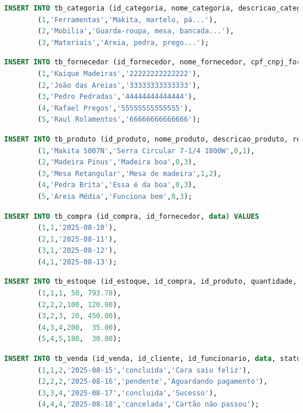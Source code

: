 \documentclass[
12pt,
a4paper,
semrecuonosumario,
sumario = abnt-6027-2012]{report}
\begin{document}
    \begin{lstlisting}[language=SQL,caption={DML -- Tabela \texttt{tb\_categoria}}]
		INSERT INTO tb_categoria (id_categoria, nome_categoria, descricao_categoria) VALUES
		(1,'Ferramentas','Makita, martelo, pá...'),
		(2,'Mobilia','Guarda-roupa, mesa, bancada...'),
		(3,'Materiais','Areia, pedra, prego...');
    \end{lstlisting}

    \begin{lstlisting}[language=SQL,caption={DML -- Tabela \texttt{tb\_fornecedor}}]
		INSERT INTO tb_fornecedor (id_fornecedor, nome_fornecedor, cpf_cnpj_fornecedor) VALUES
		(1,'Kaique Madeiras','22222222222222'),
		(2,'João das Areias','33333333333333'),
		(3,'Pedro Pedradas','44444444444444'),
		(4,'Rafael Pregos','55555555555555'),
		(5,'Raul Rolamentos','66666666666666');
    \end{lstlisting}

    \begin{lstlisting}[language=SQL,caption={DML -- Tabela \texttt{tb\_produto}}]
		INSERT INTO tb_produto (id_produto, nome_produto, descricao_produto, requer_montagem, id_categoria) VALUES
		(1,'Makita 5007N','Serra Circular 7-1/4 1800W',0,1),
		(2,'Madeira Pinus','Madeira boa',0,3),
		(3,'Mesa Retangular','Mesa de madeira',1,2),
		(4,'Pedra Brita','Essa é da boa',0,3),
		(5,'Areia Média','Funciona bem',0,3);
    \end{lstlisting}

    \begin{lstlisting}[language=SQL,caption={DML -- Tabela \texttt{tb\_compra}}]
		INSERT INTO tb_compra (id_compra, id_fornecedor, data) VALUES
		(1,1,'2025-08-10'),
		(2,1,'2025-08-11'),
		(3,1,'2025-08-12'),
		(4,1,'2025-08-13');
    \end{lstlisting}

    \begin{lstlisting}[language=SQL,caption={DML -- Tabela \texttt{tb\_estoque}}]
		INSERT INTO tb_estoque (id_estoque, id_compra, id_produto, quantidade, preco_estoque) VALUES
		(1,1,1, 50, 793.78),
		(2,2,2,100, 120.00),
		(3,2,3, 20, 450.00),
		(4,3,4,200,  35.00),
		(5,4,5,180,  30.00);
    \end{lstlisting}

    \begin{lstlisting}[language=SQL,caption={DML -- Tabela \texttt{tb\_venda}}]
		INSERT INTO tb_venda (id_venda, id_cliente, id_funcionario, data, status, observacao_venda) VALUES
		(1,1,2,'2025-08-15','concluida','Cara saiu feliz'),
		(2,2,2,'2025-08-16','pendente','Aguardando pagamento'),
		(3,3,4,'2025-08-17','concluida','Sucesso'),
		(4,4,4,'2025-08-18','cancelada','Cartão não passou');
    \end{lstlisting}
\end{document}
